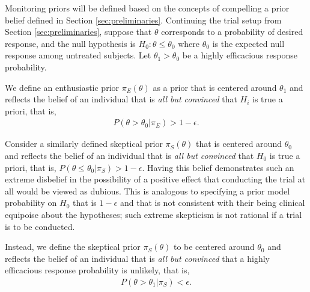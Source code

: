 \documentclass[12pt]{article}
\begin{document}
%
%

Monitoring priors will be defined based on the concepts of compelling a prior belief defined in Section \ref{sec:preliminaries}. Continuing the trial setup from Section \ref{sec:preliminaries}, suppose that $\theta$ corresponds to a probability of desired response, and the null hypothesis is $H_0:\theta\leq\theta_0$ where $\theta_0$ is the expected null response among untreated subjects. 
%
Let $\theta_1>\theta_0$ be a highly efficacious response probability.
%

We define an enthusiastic prior $\pi_{E}(\theta)$ as a prior that is centered around $\theta_1$ and reflects the belief of an individual that is \textit{all but convinced} that $H_i$ is true a priori, that is, 
\begin{align}\label{eq:enthprior}
P(\theta >\theta_0| \pi_{E})>1-\epsilon.
\end{align} 

Consider a similarly defined skeptical prior $\pi_{S}(\theta)$ that is centered around $\theta_0$ and reflects the belief of an individual that is \textit{all but convinced} that $H_0$ is true a priori, that is, $P(\theta\leq\theta_0| \pi_{S})>1-\epsilon$. Having this belief demonstrates such an extreme disbelief in the possibility of a positive effect that conducting the trial at all would be viewed as dubious. This is analogous to specifying a prior model probability on $H_0$ that is $1-\epsilon$ and that is not consistent with their being clinical equipoise about the hypotheses; such extreme skepticism is not rational if a trial is to be conducted. 

Instead, we define the skeptical prior $\pi_S(\theta)$ to be centered around $\theta_0$ and reflects the belief of an individual that is \textit{all but convinced} that a highly efficacious response probability is unlikely, that is,  
\begin{align}\label{eq:skptprior}
P(\theta>\theta_1| \pi_{S})<\epsilon.
\end{align}
\end{document}
